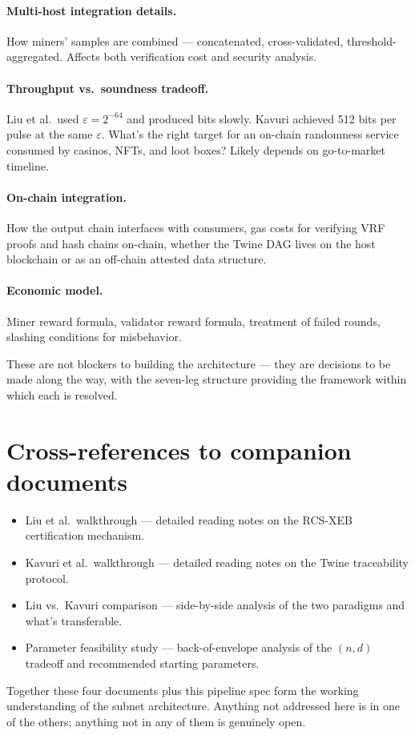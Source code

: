 \documentclass[11pt]{article}
\begin{document}
\paragraph{Multi-host integration details.} How miners' samples are combined --- concatenated, cross-validated, threshold-aggregated. Affects both verification cost and security analysis.

\paragraph{Throughput vs.\ soundness tradeoff.} Liu et al.\ used $\varepsilon = 2^{-64}$ and produced bits slowly. Kavuri achieved 512 bits per pulse at the same $\varepsilon$. What's the right target for an on-chain randomness service consumed by casinos, NFTs, and loot boxes? Likely depends on go-to-market timeline.

\paragraph{On-chain integration.} How the output chain interfaces with consumers, gas costs for verifying VRF proofs and hash chains on-chain, whether the Twine DAG lives on the host blockchain or as an off-chain attested data structure.

\paragraph{Economic model.} Miner reward formula, validator reward formula, treatment of failed rounds, slashing conditions for misbehavior.

These are not blockers to building the architecture --- they are decisions to be made along the way, with the seven-leg structure providing the framework within which each is resolved.

\section{Cross-references to companion documents}

\begin{itemize}
    \item Liu et al.\ walkthrough --- detailed reading notes on the RCS-XEB certification mechanism.
    \item Kavuri et al.\ walkthrough --- detailed reading notes on the Twine traceability protocol.
    \item Liu vs.\ Kavuri comparison --- side-by-side analysis of the two paradigms and what's transferable.
    \item Parameter feasibility study --- back-of-envelope analysis of the $(n, d)$ tradeoff and recommended starting parameters.
\end{itemize}

Together these four documents plus this pipeline spec form the working understanding of the subnet architecture. Anything not addressed here is in one of the others; anything not in any of them is genuinely open.
\end{document}
